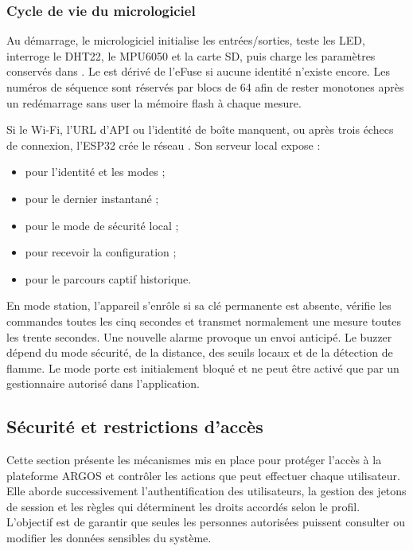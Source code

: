 \subsubsection{Cycle de vie du micrologiciel}

Au démarrage, le micrologiciel initialise les entrées/sorties, teste les LED,
interroge le DHT22, le MPU6050 et la carte SD, puis charge les paramètres
conservés dans . Le  est dérivé de l'eFuse
si aucune identité n'existe encore. Les numéros de séquence sont réservés par
blocs de 64 afin de rester monotones après un redémarrage sans user la mémoire
flash à chaque mesure.

Si le Wi-Fi, l'URL d'API ou l'identité de boîte manquent, ou après trois
échecs de connexion, l'ESP32 crée le réseau
. Son serveur local expose :
\begin{itemize}
    \item {} pour l'identité et les modes ;
    \item {} pour le dernier instantané ;
    \item {} pour le mode de sécurité local ;
    \item {} pour recevoir la configuration ;
    \item {} pour le parcours captif historique.
\end{itemize}

En mode station, l'appareil s'enrôle si sa clé permanente est absente, vérifie
les commandes toutes les cinq secondes et transmet normalement une mesure
toutes les trente secondes. Une nouvelle alarme provoque un envoi anticipé.
Le buzzer dépend du mode sécurité, de la distance, des seuils locaux et de la
détection de flamme. Le mode porte est initialement bloqué et ne peut être
activé que par un gestionnaire autorisé dans l'application.

\subsection{Sécurité et restrictions d'accès}

Cette section présente les mécanismes mis en place pour protéger l'accès à la plateforme ARGOS et contrôler les actions que peut effectuer chaque utilisateur. Elle aborde successivement l'authentification des utilisateurs, la gestion des jetons de session et les règles qui déterminent les droits accordés selon le profil. L'objectif est de garantir que seules les personnes autorisées puissent consulter ou modifier les données sensibles du système.

